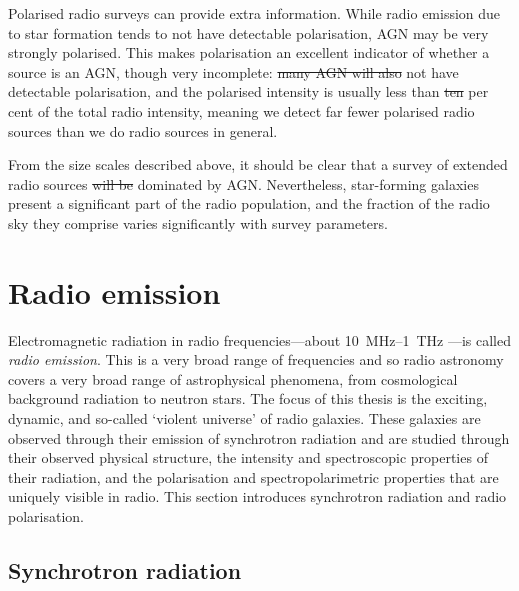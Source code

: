\documentclass[11pt, a4paper]{book}
\newcommand{\defn}[1]{\emph{#1}}
\providecommand{\DIFaddtex}[1]{{\protect\color{blue}\uwave{#1}}} %
\providecommand{\DIFdeltex}[1]{{\protect\color{red}\sout{#1}}}                      %
\providecommand{\DIFaddbegin}{} %
\providecommand{\DIFaddend}{} %
\providecommand{\DIFdelbegin}{} %
\providecommand{\DIFdelend}{} %
\providecommand{\DIFadd}[1]{\texorpdfstring{\DIFaddtex{#1}}{#1}} %
\providecommand{\DIFdel}[1]{\texorpdfstring{\DIFdeltex{#1}}{}} %
\newcommand{\DIFscaledelfig}{0.5}
\newlength{\DIFdelgraphicswidth} %
\newlength{\DIFdelgraphicsheight} %
\newcommand{\DIFaddincludegraphics}[2][]{{\color{blue}\fbox{\DIFOincludegraphics[#1]{#2}}}} %
\newcommand{\DIFdelincludegraphics}[2][]{%
\sbox{\DIFdelgraphicsbox}{\DIFOincludegraphics[#1]{#2}}%
\settoboxwidth{\DIFdelgraphicswidth}{\DIFdelgraphicsbox} %
\settoboxtotalheight{\DIFdelgraphicsheight}{\DIFdelgraphicsbox} %
\scalebox{\DIFscaledelfig}{%
\parbox[b]{\DIFdelgraphicswidth}{\usebox{\DIFdelgraphicsbox}\\[-\baselineskip] \rule{\DIFdelgraphicswidth}{0em}}\llap{\resizebox{\DIFdelgraphicswidth}{\DIFdelgraphicsheight}{%
\setlength{\unitlength}{\DIFdelgraphicswidth}%
\begin{picture}(1,1)%
\thicklines\linethickness{2pt} %
{\color[rgb]{1,0,0}\put(0,0){\framebox(1,1){}}}%
{\color[rgb]{1,0,0}\put(0,0){\line( 1,1){1}}}%
{\color[rgb]{1,0,0}\put(0,1){\line(1,-1){1}}}%
\end{picture}%
}\hspace*{3pt}}} %
} %
\DeclareRobustCommand{\DIFaddbegin}{\DIFOaddbegin \let\includegraphics\DIFaddincludegraphics} %
\DeclareRobustCommand{\DIFaddend}{\DIFOaddend \let\includegraphics\DIFOincludegraphics} %
\DeclareRobustCommand{\DIFdelbegin}{\DIFOdelbegin \let\includegraphics\DIFdelincludegraphics} %
\DeclareRobustCommand{\DIFdelend}{\DIFOaddend \let\includegraphics\DIFOincludegraphics} %
\begin{document}
    Polarised radio surveys can provide extra information. While radio emission due to star formation tends to not have detectable polarisation, AGN may be very strongly polarised. This makes polarisation an excellent indicator of whether a source is an AGN, though very incomplete: \DIFdelbegin \DIFdel{many AGN will also }\DIFdelend \DIFaddbegin \DIFadd{Many AGN do }\DIFaddend not have detectable polarisation, and the polarised intensity is usually less than \DIFdelbegin \DIFdel{ten }\DIFdelend \DIFaddbegin \DIFadd{10 }\DIFaddend per cent of the total radio intensity, meaning we detect far fewer polarised radio sources than we do radio sources in general.

    From the size scales described above, it should be clear that a survey of extended radio sources \DIFdelbegin \DIFdel{will be }\DIFdelend \DIFaddbegin \DIFadd{is }\DIFaddend dominated by AGN. Nevertheless, star-forming galaxies present a significant part of the radio population, and the fraction of the radio sky they comprise varies significantly with survey parameters.

\section{Radio emission}
\label{sec:radio-astronomy}

    Electromagnetic radiation in radio frequencies---about 10~MHz--1~THz \citep{condon_essential_2016}---is called \defn{radio emission}. This is a very broad range of frequencies and so radio astronomy covers a very broad range of astrophysical phenomena, from cosmological background radiation to neutron stars. The focus of this thesis is the exciting, dynamic, and so-called `violent universe' of radio galaxies. These galaxies are observed through their emission of synchrotron radiation and are studied through their observed physical structure, the intensity and spectroscopic properties of their radiation, and the polarisation and spectropolarimetric properties that are uniquely visible in radio. This section introduces synchrotron radiation and radio polarisation.

    \subsection{Synchrotron radiation}
    \label{sec:synchrotron}
\end{document}
